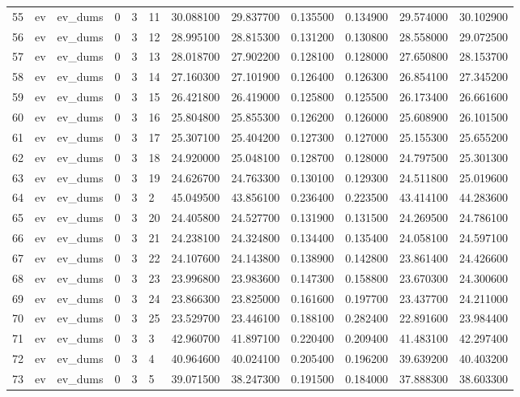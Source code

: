 \begin{tabular}{llllllrrrrrr}
55 & ev & ev_dums & 0 & 3 & 11 & 30.088100 & 29.837700 & 0.135500 & 0.134900 & 29.574000 & 30.102900 \\
56 & ev & ev_dums & 0 & 3 & 12 & 28.995100 & 28.815300 & 0.131200 & 0.130800 & 28.558000 & 29.072500 \\
57 & ev & ev_dums & 0 & 3 & 13 & 28.018700 & 27.902200 & 0.128100 & 0.128000 & 27.650800 & 28.153700 \\
58 & ev & ev_dums & 0 & 3 & 14 & 27.160300 & 27.101900 & 0.126400 & 0.126300 & 26.854100 & 27.345200 \\
59 & ev & ev_dums & 0 & 3 & 15 & 26.421800 & 26.419000 & 0.125800 & 0.125500 & 26.173400 & 26.661600 \\
60 & ev & ev_dums & 0 & 3 & 16 & 25.804800 & 25.855300 & 0.126200 & 0.126000 & 25.608900 & 26.101500 \\
61 & ev & ev_dums & 0 & 3 & 17 & 25.307100 & 25.404200 & 0.127300 & 0.127000 & 25.155300 & 25.655200 \\
62 & ev & ev_dums & 0 & 3 & 18 & 24.920000 & 25.048100 & 0.128700 & 0.128000 & 24.797500 & 25.301300 \\
63 & ev & ev_dums & 0 & 3 & 19 & 24.626700 & 24.763300 & 0.130100 & 0.129300 & 24.511800 & 25.019600 \\
64 & ev & ev_dums & 0 & 3 & 2 & 45.049500 & 43.856100 & 0.236400 & 0.223500 & 43.414100 & 44.283600 \\
65 & ev & ev_dums & 0 & 3 & 20 & 24.405800 & 24.527700 & 0.131900 & 0.131500 & 24.269500 & 24.786100 \\
66 & ev & ev_dums & 0 & 3 & 21 & 24.238100 & 24.324800 & 0.134400 & 0.135400 & 24.058100 & 24.597100 \\
67 & ev & ev_dums & 0 & 3 & 22 & 24.107600 & 24.143800 & 0.138900 & 0.142800 & 23.861400 & 24.426600 \\
68 & ev & ev_dums & 0 & 3 & 23 & 23.996800 & 23.983600 & 0.147300 & 0.158800 & 23.670300 & 24.300600 \\
69 & ev & ev_dums & 0 & 3 & 24 & 23.866300 & 23.825000 & 0.161600 & 0.197700 & 23.437700 & 24.211000 \\
70 & ev & ev_dums & 0 & 3 & 25 & 23.529700 & 23.446100 & 0.188100 & 0.282400 & 22.891600 & 23.984400 \\
71 & ev & ev_dums & 0 & 3 & 3 & 42.960700 & 41.897100 & 0.220400 & 0.209400 & 41.483100 & 42.297400 \\
72 & ev & ev_dums & 0 & 3 & 4 & 40.964600 & 40.024100 & 0.205400 & 0.196200 & 39.639200 & 40.403200 \\
73 & ev & ev_dums & 0 & 3 & 5 & 39.071500 & 38.247300 & 0.191500 & 0.184000 & 37.888300 & 38.603300 \\

\end{tabular}
